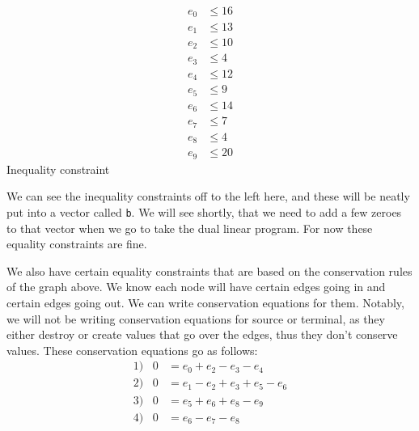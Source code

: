 \documentclass[11pt]{article}
\begin{document}
    \begin{minipage}[t]{.22\linewidth}
        \begin{align*}
            e_0 &\leq 16     \\
            e_1 &\leq 13     \\ 
            e_2 &\leq 10     \\
            e_3 &\leq 4      \\
            e_4 &\leq 12     \\
            e_5 &\leq 9      \\
            e_6 &\leq 14     \\
            e_7 &\leq 7      \\
            e_8 &\leq 4      \\
            e_9 &\leq 20     
        \end{align*}
        Inequality constraint
    \end{minipage} \hfill \vline \hfill %
    \begin{minipage}[t]{.74\linewidth}
        We can see the inequality constraints off to the left here, and these
        will be neatly put into a vector called \texttt{b}. We will see
        shortly, that we need to add a few zeroes to that vector when we go to
        take the dual linear program. For now these equality constraints are
        fine.

        \medskip
         
        We also have certain equality constraints that are based on the
        conservation rules of the graph above. We know each node will have
        certain edges going in and certain edges going out. We can write
        conservation equations for them. Notably, we will not be writing
        conservation equations for source or terminal, as they either destroy
        or create values that go over the edges, thus they don't conserve
        values. These conservation equations go as follows:
        \begin{align*}
            1)\;\;\;0 &= e_0 + e_2 - e_3 - e_4  \\
            2)\;\;\;0 &= e_1 - e_2 + e_3 + e_5 - e_6    \\
            3)\;\;\;0 &= e_5 + e_6 + e_8 - e_9  \\
            4)\;\;\;0 &= e_6 - e_7 - e_8        \\
        \end{align*}
    \end{minipage}
\end{document}
